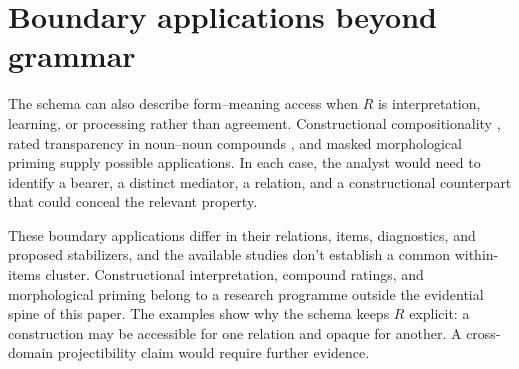 \section{Boundary applications beyond grammar}\label{sec:3}

The schema can also describe form--meaning access when $R$ is interpretation, learning, or processing rather than agreement. Constructional compositionality \autocite{goldberg-2006-constructions-at-work}, rated transparency in noun--noun compounds \autocite{bell-schafer-2016-modelling-transparency}, and masked morphological priming \autocite{heyer-kornishova-2018-priming-eventually} supply possible applications. In each case, the analyst would need to identify a bearer, a distinct mediator, a relation, and a constructional counterpart that could conceal the relevant property.

These boundary applications differ in their relations, items, diagnostics, and proposed stabilizers, and the available studies don't establish a common within-items cluster. Constructional interpretation, compound ratings, and morphological priming belong to a research programme outside the evidential spine of this paper. The examples show why the schema keeps $R$ explicit: a construction may be accessible for one relation and opaque for another. A cross-domain projectibility claim would require further evidence.
